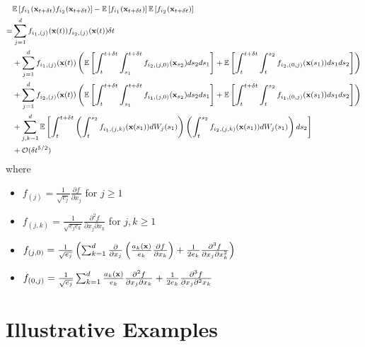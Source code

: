 \begin{equation} \label{eq:cov_est}
\footnotesize
\begin{aligned}
&\mathbb{E} \left[ f_{i_1}(\mathbf{x}_{t + \delta t}) f_{i_2}(\mathbf{x}_{t + \delta t}) \right] 
- \mathbb{E} \left[ f_{i_1}(\mathbf{x}_{t + \delta t}) \right] \mathbb{E} \left[ f_{i_2}(\mathbf{x}_{t + \delta t}) \right] \\
=& 
 \sum_{j=1}^d f_{{i_1},(j)}(\mathbf{x}(t)) f_{{i_2},(j)}(\mathbf{x}(t)) \delta t \\
&+ \sum_{j=1}^d f_{{i_1},(j)}(\mathbf{x}(t)) \left( \mathbb{E} \left[ \int_t^{t+\delta t} \int_{s_1}^{t+\delta t} f_{{i_2},(j,0)}(\mathbf{x}_{s_2}) ds_2 ds_1 \right] 
+ \mathbb{E} \left[  \int_t^{t+\delta t} \int_t^{s_2} f_{{i_2},(0,j)}(\mathbf{x}(s_1)) ds_1 ds_2\right] \right) \\
&+  \sum_{j=1}^d f_{{i_2},(j)}(\mathbf{x}(t)) \left( \mathbb{E} \left[ \int_t^{t+\delta t} \int_{s_1}^{t + \delta t} f_{{i_1},(j,0)}(\mathbf{x}_{s_2}) ds_2 ds_1 \right]
+ \mathbb{E} \left[ \int_t^{t+\delta t} \int_t^{s_2} f_{{i_1},(0,j)}(\mathbf{x}(s_1)) ds_1 ds_2 \right] \right) \\
&+ \sum_{j, k=1}^d \mathbb{E} \left[ \int_t^{t+\delta t}\left( \int_t^{s_2} f_{{i_1},(j,k)}(\mathbf{x}(s_1)) dW_j(s_1)  \right) \left(  \int_t^{s_2} f_{{i_2},(j,k)}(\mathbf{x}(s_1)) dW_j(s_1) \right) ds_2 \right] \\
&+ \mathcal{O} (\delta t^{5/2})
\end{aligned}
\end{equation}
%
where
\begin{itemize}
\item $f_{(j)} = \frac{1}{\sqrt{e_j}} \frac{\partial f}{\partial x_j}$ for $j \ge 1$
\item $f_{(j, k)} = \frac{1}{\sqrt{e_j e_k}} \frac{\partial^2 f}{\partial x_j \partial x_k}$ for $j,k \ge 1$
\item $f_{(j,0)} = \frac{1}{\sqrt{e_j}} \left( \sum_{k=1}^d \frac{\partial}{\partial x_j} \left( \frac{a_k(\mathbf{x})}{e_k} \frac{\partial f}{\partial x_k} \right) + \frac{1}{2 e_k} \frac{\partial^3 f}{\partial x_j \partial x_k^2} \right)$
\item $f_{(0, j)} = \frac{1}{\sqrt{e_j}} \sum_{k=1}^d \frac{a_k(\mathbf{x})}{e_k} \frac{\partial^2 f}{\partial x_j \partial x_k} +\frac{1}{2 e_k}  \frac{\partial^3 f}{\partial x_j \partial^2 x_k}$
\end{itemize}

\section{Illustrative Examples}

